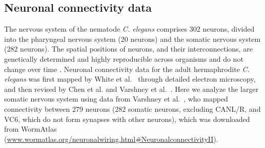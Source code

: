 \documentclass[10pt,letterpaper]{article}
\begin{document}

\subsection*{Neuronal connectivity data}
The nervous system of the nematode \emph{C. elegans} comprises 302 neurons, divided into the pharyngeal nervous system (20 neurons) and the somatic nervous system (282 neurons).
The spatial positions of neurons, and their interconnections, are genetically determined and highly reproducible across organisms \cite{Riddle1997} and do not change over time \cite{Schnabel1997}.
Neuronal connectivity data for the adult hermaphrodite \emph{C. elegans} was first mapped by White et al.~\cite{White:1986tx} through detailed electron microscopy, and then revised by Chen et al. \cite{Chen:2006ie} and Varshney et al.~\cite{Varshney2011}.
Here we analyze the larger somatic nervous system using data from Varshney et al.~\cite{Varshney2011}, who mapped connectivity between 279 neurons (282 somatic neurons, excluding CANL/R, and VC6, which do not form synapses with other neurons), which was downloaded from WormAtlas \cite{WormAtlas} (\url{www.wormatlas.org/neuronalwiring.html#NeuronalconnectivityII}).
\end{document}
